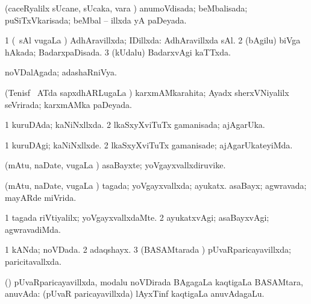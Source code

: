 {{\bentry
{} 
\gl{\gu}
\expl{}
\bmng
(caceRyalilx sUcane, sUcaka, \mo vara \vi) anumoVdisada; beMbalisada; puSiTxVkarisada; beMbal -- illxda yA paDeyada. 
\emng
\eentry

\bentry
{} 
\gl{\gu}
\expl{}
\bmng
\bnum
\num{1} (\kanmu\ sAl \mo vugaLa \vi) AdhAravillxda; IDillxda:  AdhAravillxda sAl. 
\num{2} (bAgilu) biVga hAkada; BadarxpaDisada. 
\num{3} (kUdalu) BadarxvAgi kaTTxda. 
\enum
\emng
\eentry

\bentry
{} 
\gl{\gu}
\expl{}
\bmng
noVDalAgada; adashaRniVya. 
\emng
\eentry

\bentry
{} 
\gl{\gu}
\expl{}
\bmng
(Tenisf \mo\ ATda sapxdhARLugaLa \vi) karxmAMkarahita; Ayadx sherxVNiyalilx seVrirada; karxmAMka paDeyada. 
\emng
\eentry

\bentry
{} 
\gl{\gu}
\expl{}
\bmng
\bnum
\num{1} kuruDAda; kaNiNxllxda. 
\num{2} lkaSxyXviTuTx gamanisada; ajAgarUka. 
\enum
\emng
\eentry

\bentry
{} 
\gl{\kirxvi}
\expl{}
\bmng
\bnum
\num{1} kuruDAgi; kaNiNxllxde. 
\num{2} lkaSxyXviTuTx gamanisade; ajAgarUkateyiMda. 
\enum
\emng
\eentry

\bentry
{} 
\gl{\nA}
\expl{}
\bmng
(mAtu, naDate, \mo vugaLa \vi) asaBayxte; yoVgayxvallxdiruvike. 
\emng
\eentry

\bentry
{} 
\gl{\gu}
\bmng
(mAtu, naDate, \mo vugaLa \vi) 
\banum
{} tagada; yoVgayxvallxda; ayukatx. 
 asaBayx; agwravada; mayARde miVrida. 
\eanum
\emng
\eentry

\bentry
{} 
\gl{\kirxvi}
\expl{}
\bmng
\bnum
\num{1} tagada riVtiyalilx; yoVgayxvallxdaMte. 
\num{2} ayukatxvAgi; asaBayxvAgi; agwravadiMda. 
\enum
\emng
\eentry

\bentry
{} 
\gl{\gu}
\expl{}
\bmng
\bnum
\num{1} kANda; noVDada. 
\num{2} adaqshayx. 
\num{3} (BASAMtarada \vi) pUvaRparicayavillxda; paricitavallxda. 
\enum
\emng
\eentry

\bentry
{} 
\gl{\nA}
\expl{}
\bmng
(\birx) pUvaRparicayavillxda, modalu noVDirada BAgagaLa kaqtigaLa BASAMtara, anuvAda:  (pUvaR paricayavillxda) lAyxTinf kaqtigaLa anuvAdagaLu. 
\emng

}}
